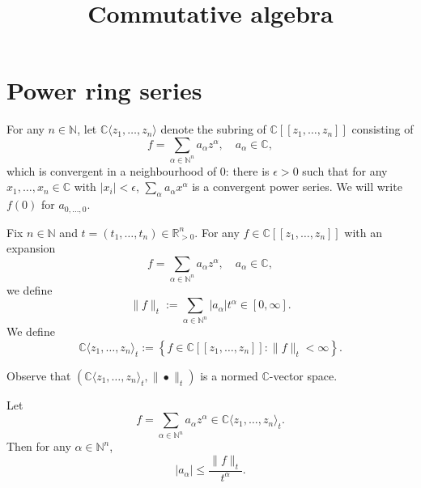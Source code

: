 






\title{Commutative algebra}







\maketitle


\tableofcontents



\section{Power ring series}

\begin{definition}
    For any $n\in \mathbb{N}$, let $\mathbb{C}\langle z_1,\ldots,z_n\rangle$ denote the subring of $\mathbb{C}[[z_1,\ldots,z_n]]$ consisting of
    \[
        f=\sum_{\alpha\in \mathbb{N}^n} a_{\alpha}z^{\alpha},\quad a_{\alpha}\in \mathbb{C},
    \]
    which is  convergent in a neighbourhood of $0$: there is $\epsilon>0$ such that for any $x_1,\ldots,x_n\in \mathbb{C}$ with $|x_i|<\epsilon$, $\sum_{\alpha}a_{\alpha} x^{\alpha}$ is a convergent power series. We will write $f(0)$ for $a_{0,\ldots,0}$.
\end{definition}


\begin{definition}
    Fix $n\in \mathbb{N}$ and $t=(t_1,\ldots,t_n)\in \mathbb{R}_{> 0}^n$. For any $f\in \mathbb{C}[[z_1,\ldots,z_n]]$ with an expansion
    \[
        f=\sum_{\alpha\in \mathbb{N}^n} a_{\alpha}z^{\alpha},\quad a_{\alpha}\in \mathbb{C},  
    \]
    we define
    \[
        \|f\|_t:=\sum_{\alpha\in \mathbb{N}^n} |a_{\alpha}| t^{\alpha}\in [0,\infty].
    \]
    We define
    \[
        \mathbb{C}\langle z_1,\ldots,z_n\rangle_t:=\left\{f\in \mathbb{C}[[z_1,\ldots,z_n]]: \|f\|_t<\infty \right\}.
    \]
\end{definition}
Observe that $(\mathbb{C}\langle z_1,\ldots,z_n\rangle_t,\|\bullet\|_t)$ is a normed $\mathbb{C}$-vector space.

\begin{theorem}
    Let 
    \[
        f=\sum_{\alpha\in \mathbb{N}^n} a_{\alpha}z^{\alpha}\in  \mathbb{C}\langle z_1,\ldots,z_n\rangle_t. 
    \]
    Then for any $\alpha \in \mathbb{N}^n$,
    \[
      |a_{\alpha}|\leq  \frac{\|f\|_t}{t^{\alpha}}.
    \]
\end{theorem}

